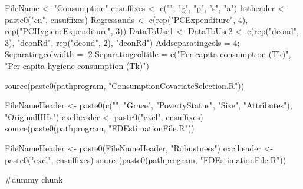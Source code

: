 \begin{Schunk}
\begin{Sinput}
FileName <- "Consumption"
cnsuffixes <- c("", "g", "p", "s", "a")
listheader <- paste0("cn", cnsuffixes)
Regressands <- c(rep("PCExpenditure", 4), rep("PCHygieneExpenditure", 3))
DataToUse1 <- DataToUse2 <- c(rep("dcond", 3), "dconRd", rep("dcond", 2), "dconRd")
Addseparatingcols = 4; Separatingcolwidth = .2
Separatingcoltitle = c("Per capita consumption (Tk)", "Per capita hygiene consumption (Tk)")
\end{Sinput}
\end{Schunk}
\begin{Schunk}
\begin{Sinput}
source(paste0(pathprogram, "ConsumptionCovariateSelection.R"))
\end{Sinput}
\end{Schunk}
\begin{Schunk}
\begin{Sinput}
FileNameHeader <- paste0(c("", "Grace", "PovertyStatus", "Size", "Attributes"),
  "OriginalHHs")
exclheader <- paste0("excl", cnsuffixes)
source(paste0(pathprogram, "FDEstimationFile.R"))
\end{Sinput}
\end{Schunk}

\begin{Schunk}
\begin{Sinput}
FileNameHeader <- paste0(FileNameHeader, "Robustness")
exclheader <- paste0("excl", cnsuffixes)
source(paste0(pathprogram, "FDEstimationFile.R"))
\end{Sinput}
\end{Schunk}
\begin{Schunk}
\begin{Sinput}
#dummy chunk
\end{Sinput}
\end{Schunk}

